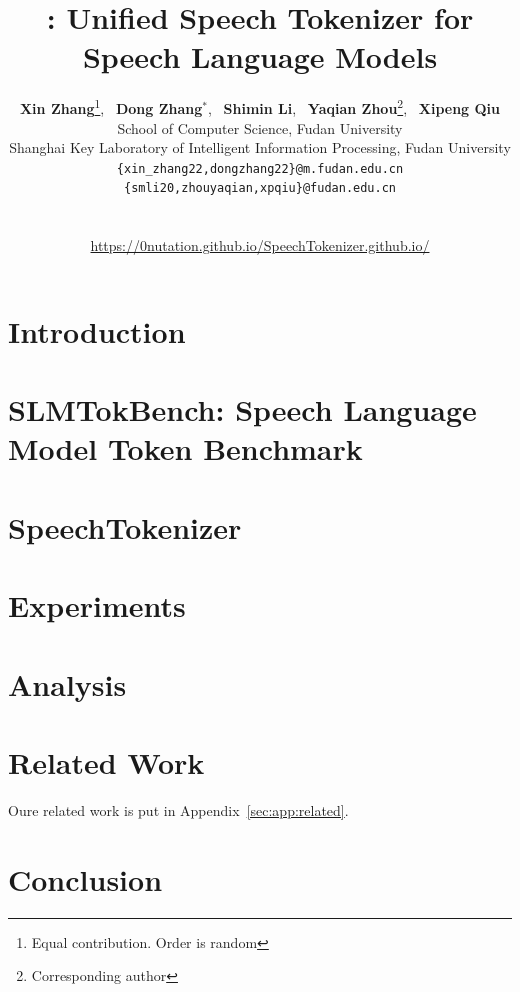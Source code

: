 \documentclass[11pt]{article}
\title{\method: Unified Speech Tokenizer for\\ Speech Language Models}
\author{
    \textbf{Xin Zhang}\thanks{Equal contribution. Order is random},
    ~\textbf{Dong Zhang$^\ast$},
    ~\textbf{Shimin Li},
    ~\textbf{Yaqian Zhou}\thanks{Corresponding author},
    ~\textbf{Xipeng Qiu}\footnotemark[\value{footnote}] \\
    School of Computer Science, Fudan University\\
    Shanghai Key Laboratory of Intelligent Information Processing, Fudan University\\
    {\tt 	\{xin\_zhang22,dongzhang22\}@m.fudan.edu.cn} \\
    {\tt 	\{smli20,zhouyaqian,xpqiu\}@fudan.edu.cn} \\
    \\\\
    \url{https://0nutation.github.io/SpeechTokenizer.github.io/}
}
\newcommand{\method}{SpeechTokenizer\xspace}
\newcommand{\bench}{SLMTokBench\xspace}
\begin{document}
\maketitle

\begin{abstract}

\end{abstract}

\section{Introduction}


\section{\bench: Speech Language Model Token Benchmark}


\section{\method}


\section{Experiments}


\section{Analysis}


\section{Related Work}
Oure related work is put in Appendix~\ref{sec:app:related}.
% 

\section{Conclusion}








\clearpage
\appendix

\end{document}
